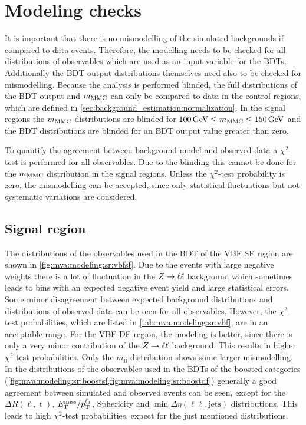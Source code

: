 \section{Modeling checks}\label{sec:mva:modeling}

It is important that there is no mismodelling of the simulated backgrounds if compared to data events.
Therefore, the modelling needs to be checked for all distributions of observables which are used as an input variable for the BDTs.
Additionally the BDT output distributions themselves need also to be checked for mismodelling.
Because the analysis is performed blinded, the full distributions of the BDT output and $m_\text{MMC}$ can only be compared to data in the control regions, which
are defined in \cref{sec:background_estimation:normalization}.
In the signal regions the $m_\text{MMC}$ distributions are blinded for $\SI{100}{\GeV} \leq \mmc \leq \SI{150}{\GeV}$
and the BDT distributions are blinded for an BDT output value greater than zero.

To quantify the agreement between background model and observed data a $\chi^2$-test is performed for all observables.
Due to the blinding this cannot be done for the $m_\text{MMC}$ distribution in the signal regions.
Unless the $\chi^2$-test probability is zero, the mismodelling can be accepted, since only statistical fluctuations but
not systematic variations are considered.

\subsection{Signal region}

The distributions of the observables used in the BDT of the VBF SF region are shown in \cref{fig:mva:modeling:sr:vbfsf}.
Due to the events with large negative weights there is a lot of fluctuation in the $Z \to \ell \ell$ background which sometimes leads
to bins with an expected negative event yield and large statistical errors.
Some minor disagreement between expected background distributions and distributions of observed data can be seen for
all observables.
However, the $\chi^2$-test probabilities, which are listed in \cref{tab:mva:modeling:sr:vbf}, are in an acceptable range.
For the VBF DF region, the modeling is better, since there is only a very minor contribution of the $Z \to \ell \ell$ background.
This results in higher $\chi^2$-test probabilities.
Only the $m_\text{jj}$ distribution shows some larger mismodelling.
In the distributions of the observables used in the BDTs of the boosted categories (\cref{fig:mva:modeling:sr:boostsf,fig:mva:modeling:sr:boostdf})
generally a good agreement between simulated and observed events can be seen, except for the $\Delta R (\ell, \ell)$,
$E_\text{T}^\text{miss} / p_\text{T}^{\ell_1}$, Sphericity and $\min \Delta \eta (\ell\ell, \text{jets})$ distributions.
This leads to high $\chi^2$-test probabilities, expect for the just mentioned distributions.

